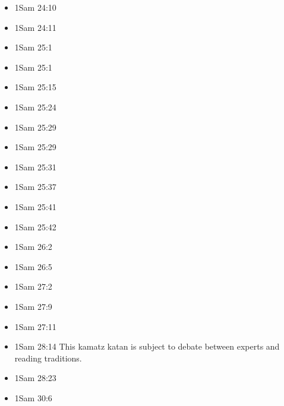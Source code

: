 \documentclass[14pt]{article}
\begin{document}
\begin{multicols}{2}
\begin{itemize}
							\item 1Sam 24:10
							
							\item 1Sam 24:11
							
							\item 1Sam 25:1
							
							\item 1Sam 25:1
							
							\item 1Sam 25:15
							
							\item 1Sam 25:24
							
							\item 1Sam 25:29
							
							\item 1Sam 25:29
							
							\item 1Sam 25:31
							
							\item 1Sam 25:37
							
							\item 1Sam 25:41
							
							\item 1Sam 25:42
							
							\item 1Sam 26:2
							
							\item 1Sam 26:5
							
							\item 1Sam 27:2
							
							\item 1Sam 27:9
							
							\item 1Sam 27:11
							
							\item 1Sam 28:14 This kamatz katan is subject to debate between experts and reading traditions.
							
							\item 1Sam 28:23
							
							\item 1Sam 30:6
							

\end{itemize}
\end{multicols}
\end{document}
